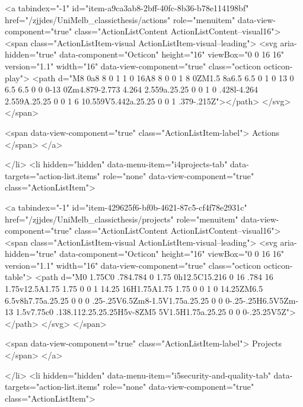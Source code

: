     
    <a tabindex="-1" id="item-a9ca3ab8-2bff-40fc-8b36-b78e114198bf" href="/zjjdes/UniMelb_classicthesis/actions" role="menuitem" data-view-component="true" class="ActionListContent ActionListContent--visual16">
        <span class="ActionListItem-visual ActionListItem-visual--leading">
          <svg aria-hidden="true" data-component="Octicon" height="16" viewBox="0 0 16 16" version="1.1" width="16" data-view-component="true" class="octicon octicon-play">
    <path d="M8 0a8 8 0 1 1 0 16A8 8 0 0 1 8 0ZM1.5 8a6.5 6.5 0 1 0 13 0 6.5 6.5 0 0 0-13 0Zm4.879-2.773 4.264 2.559a.25.25 0 0 1 0 .428l-4.264 2.559A.25.25 0 0 1 6 10.559V5.442a.25.25 0 0 1 .379-.215Z"></path>
</svg>
        </span>
      
        <span data-view-component="true" class="ActionListItem-label">
          Actions
</span>      
</a>
  
</li>
        <li hidden="hidden" data-menu-item="i4projects-tab" data-targets="action-list.items" role="none" data-view-component="true" class="ActionListItem">
    
    
    <a tabindex="-1" id="item-429625f6-bf0b-4621-87c5-cf4f78e2931c" href="/zjjdes/UniMelb_classicthesis/projects" role="menuitem" data-view-component="true" class="ActionListContent ActionListContent--visual16">
        <span class="ActionListItem-visual ActionListItem-visual--leading">
          <svg aria-hidden="true" data-component="Octicon" height="16" viewBox="0 0 16 16" version="1.1" width="16" data-view-component="true" class="octicon octicon-table">
    <path d="M0 1.75C0 .784.784 0 1.75 0h12.5C15.216 0 16 .784 16 1.75v12.5A1.75 1.75 0 0 1 14.25 16H1.75A1.75 1.75 0 0 1 0 14.25ZM6.5 6.5v8h7.75a.25.25 0 0 0 .25-.25V6.5Zm8-1.5V1.75a.25.25 0 0 0-.25-.25H6.5V5Zm-13 1.5v7.75c0 .138.112.25.25.25H5v-8ZM5 5V1.5H1.75a.25.25 0 0 0-.25.25V5Z"></path>
</svg>
        </span>
      
        <span data-view-component="true" class="ActionListItem-label">
          Projects
</span>      
</a>
  
</li>
        <li hidden="hidden" data-menu-item="i5security-and-quality-tab" data-targets="action-list.items" role="none" data-view-component="true" class="ActionListItem">
    
